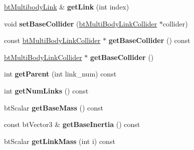 \begin{DoxyCompactItemize}
\item 
\hypertarget{classbt_multi_body_a780d83915c460c1a17f098d47b2c8df2}{\hyperlink{structbt_multibody_link}{bt\+Multibody\+Link} \& {\bfseries get\+Link} (int index)}\label{classbt_multi_body_a780d83915c460c1a17f098d47b2c8df2}

\item 
\hypertarget{classbt_multi_body_afe617a7ba5ab8538212ed9019721ee34}{void {\bfseries set\+Base\+Collider} (\hyperlink{classbt_multi_body_link_collider}{bt\+Multi\+Body\+Link\+Collider} $\ast$collider)}\label{classbt_multi_body_afe617a7ba5ab8538212ed9019721ee34}

\item 
\hypertarget{classbt_multi_body_aa79e0fa50d51a69866b3797349dc27fa}{const \hyperlink{classbt_multi_body_link_collider}{bt\+Multi\+Body\+Link\+Collider} $\ast$ {\bfseries get\+Base\+Collider} () const }\label{classbt_multi_body_aa79e0fa50d51a69866b3797349dc27fa}

\item 
\hypertarget{classbt_multi_body_a8553158acf5059cba677db783dc03ecd}{\hyperlink{classbt_multi_body_link_collider}{bt\+Multi\+Body\+Link\+Collider} $\ast$ {\bfseries get\+Base\+Collider} ()}\label{classbt_multi_body_a8553158acf5059cba677db783dc03ecd}

\item 
\hypertarget{classbt_multi_body_acdd7254ef29655dec23fff85ae813fa3}{int {\bfseries get\+Parent} (int link\+\_\+num) const }\label{classbt_multi_body_acdd7254ef29655dec23fff85ae813fa3}

\item 
\hypertarget{classbt_multi_body_acef820064e4e581db9ba6f8975add485}{int {\bfseries get\+Num\+Links} () const }\label{classbt_multi_body_acef820064e4e581db9ba6f8975add485}

\item 
\hypertarget{classbt_multi_body_aef5c1ba30457bf8e7c74044f01064bd0}{bt\+Scalar {\bfseries get\+Base\+Mass} () const }\label{classbt_multi_body_aef5c1ba30457bf8e7c74044f01064bd0}

\item 
\hypertarget{classbt_multi_body_a78eb1091ecbc5fd203f70708ec44bada}{const bt\+Vector3 \& {\bfseries get\+Base\+Inertia} () const }\label{classbt_multi_body_a78eb1091ecbc5fd203f70708ec44bada}

\item 
\hypertarget{classbt_multi_body_a9e42b7ba9ad1c1574ee3079a1cf260c4}{bt\+Scalar {\bfseries get\+Link\+Mass} (int i) const }\label{classbt_multi_body_a9e42b7ba9ad1c1574ee3079a1cf260c4}


\end{DoxyCompactItemize}
